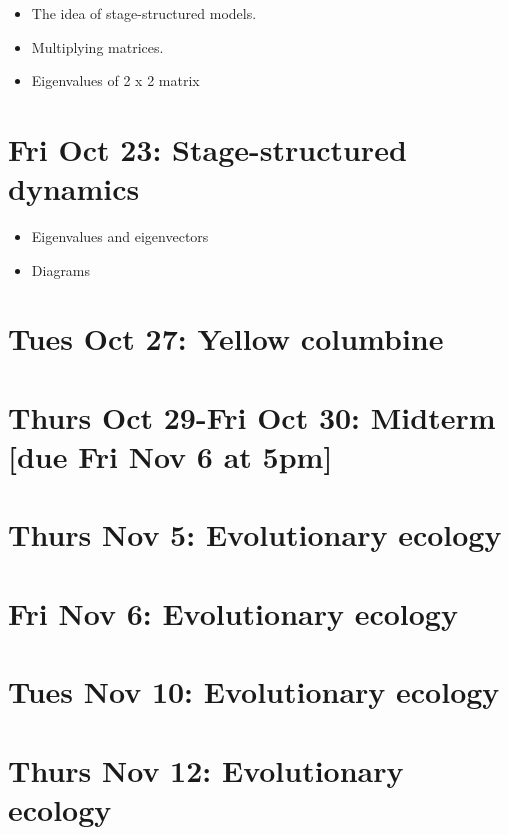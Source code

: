 \documentclass[]{book}
\providecommand{\tightlist}{%
  \setlength{\itemsep}{0pt}\setlength{\parskip}{0pt}}
\begin{document}
\begin{itemize}
\tightlist
\item
  The idea of stage-structured models.
\item
  Multiplying matrices.
\item
  Eigenvalues of 2 x 2 matrix
\end{itemize}

\chapter{Fri Oct 23: Stage-structured
dynamics}\label{fri-oct-23-stage-structured-dynamics}

\begin{itemize}
\tightlist
\item
  Eigenvalues and eigenvectors
\item
  Diagrams
\end{itemize}

\chapter{Tues Oct 27: Yellow
columbine}\label{tues-oct-27-yellow-columbine}

\chapter{Thurs Oct 29-Fri Oct 30: Midterm {[}due Fri Nov 6 at
5pm{]}}\label{thurs-oct-29-fri-oct-30-midterm-due-fri-nov-6-at-5pm}

\chapter{Thurs Nov 5: Evolutionary
ecology}\label{thurs-nov-5-evolutionary-ecology}

\chapter{Fri Nov 6: Evolutionary
ecology}\label{fri-nov-6-evolutionary-ecology}

\chapter{Tues Nov 10: Evolutionary
ecology}\label{tues-nov-10-evolutionary-ecology}

\chapter{Thurs Nov 12: Evolutionary
ecology}\label{thurs-nov-12-evolutionary-ecology}
\end{document}
